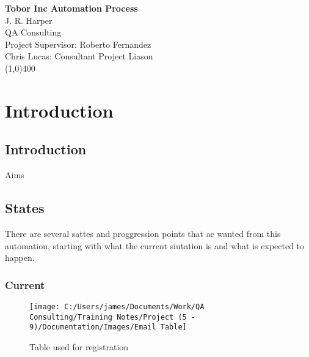 \documentclass[12]{article}
\begin{document}
\begin{titlepage}
\begin{center}
	
	\LARGE{\bf{Tobor Inc Automation Process}}\\
	[1cm]
	\large{J. R. Harper \\ QA Consulting \\ Project Supervisor: Roberto Fernandez}\\
	\large{Chris Lucas: Consultant Project Liason } \\
	[0.2cm]
	\line(1,0){400} \\
	
\end{center}


\end{titlepage}

\cleardoublepage

\tableofcontents

\thispagestyle{empty}

\cleardoublepage


\section{Introduction}\label{sec:intro}

\setcounter{page}{1}

\subsection{Introduction}

Aims

\subsection{States}

There are several sattes and proggression points that ae wanted from this automation, starting with what the current siutation is and what is expected to happen.

\subsubsection{Current}

\begin{figure}[H]
	\centering
	\texttt{[image: C:/Users/james/Documents/Work/QA Consulting/Training Notes/Project (5 - 9)/Documentation/Images/Email Table]}
	\caption[RegistrationTable]{Table used for registration}
	\label{fig:RegistrationTable}
\end{figure}
\end{document}
